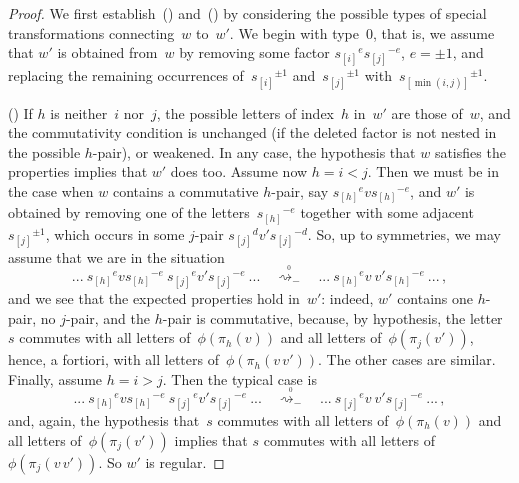 \documentclass{amsart}
\numberwithin{equation}{section}
\theoremstyle{plain}
\theoremstyle{definition}
\newcounter{ITEM}
\begin{document}
\begin{proof}
We first establish~{\setcounter{ITEM}{1}\leavevmode\hbox{\rm()}} and~{\setcounter{ITEM}{2}\leavevmode\hbox{\rm()}} by considering the possible types of special transformations connecting~${w}$ to~${w}'$. We begin with type~$0$, that is, we assume that ${w}'$ is obtained from~${w}$ by removing some factor ${{s}_{[{i}]}}^{e} {{s}_{[{j}]}}^{-{e}}$, ${e} = \pm1$, and replacing the remaining occurrences of~${{s}_{[{i}]}}^{\pm1}$ and~${{s}_{[{j}]}}^{\pm1}$ with~${{s}_{[{\min({i}, {j})}]}}^{\pm1}$. 

{\setcounter{ITEM}{1}\leavevmode\hbox{\rm()}} If ${h}$ is neither~${i}$ nor~${j}$, the possible letters of index~${h}$ in~${w}'$ are those of~${w}$, and the commutativity condition is unchanged (if the deleted factor is not nested in the possible ${h}$-pair), or weakened. In any case, the hypothesis that ${w}$ satisfies the properties implies that ${w}'$ does too. Assume now ${h} = {i} < {j}$. Then we must be in the case when ${w}$ contains a commutative ${h}$-pair, say ${{s}_{[{h}]}}^{e} {v} {{s}_{[{h}]}}^{-{e}}$, and ${w}'$ is obtained by removing one of the letters~${{s}_{[{h}]}}^{-{e}}$ together with some adjacent~${{s}_{[{j}]}}^{\pm1}$, which occurs in some ${j}$-pair ${{s}_{[{j}]}}^{d} {v}' {{s}_{[{j}]}}^{-{d}}$. So, up to symmetries, we may assume that we are in the situation
$$ ... \ {{s}_{[{h}]}}^{e} {v} {{s}_{[{h}]}}^{-{e}} \ {{s}_{[{j}]}}^{e} {v}' {{s}_{[{j}]}}^{-{e}} \ ... \quad{\mathrel{\overset{{}_{0}}{\rightsquigarrow_{\!\!\!\!\!\!-}}}}\quad ... \ {{s}_{[{h}]}}^{e} {v} \ {v}' {{s}_{[{h}]}}^{-{e}}\ ... \, ,$$
and we see that the expected properties hold in~${w}'$: indeed, ${w}'$ contains one ${h}$-pair, no ${j}$-pair, and the ${h}$-pair is commutative, because, by hypothesis, the letter~${s}$ commutes with all letters of~$\phi(\pi_{h}({v}))$ and all letters of~$\phi(\pi_{j}({v}'))$, hence, a fortiori, with all letters of~$\phi(\pi_{h}({v}\, {v}'))$. The other cases are similar. Finally, assume ${h} = {i} > {j}$. Then the typical case is
$$ ... \ {{s}_{[{h}]}}^{e} {v} {{s}_{[{h}]}}^{-{e}} \ {{s}_{[{j}]}}^{e} {v}' {{s}_{[{j}]}}^{-{e}} \ ... \quad{\mathrel{\overset{{}_{0}}{\rightsquigarrow_{\!\!\!\!\!\!-}}}}\quad ... \ {{s}_{[{j}]}}^{e} {v} \ {v}' {{s}_{[{j}]}}^{-{e}}\ ... \, ,$$
and, again, the hypothesis that~${s}$ commutes with all letters of~$\phi(\pi_{h}({v}))$ and all letters of~$\phi(\pi_{j}({v}'))$ implies that ${s}$ commutes with all letters of~$\phi(\pi_{j}({v}\, {v}'))$. So ${w}'$ is regular.


\end{proof}
\end{document}
